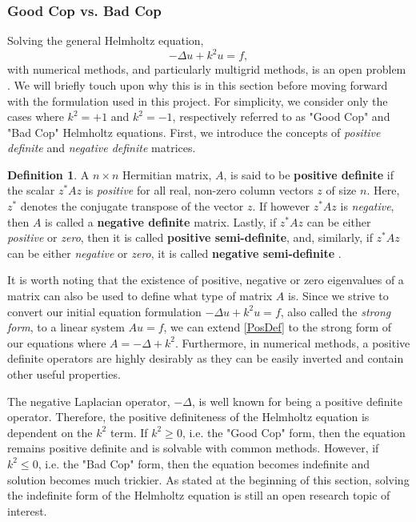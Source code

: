 \documentclass[]{article}
\theoremstyle{definition}
\newtheorem{definition}{Definition}[section]
\begin{document}
\subsubsection{Good Cop vs. Bad Cop}


Solving the general Helmholtz equation, 
\begin{equation}
-\Delta u + k^2 u = f,
\end{equation} 
with numerical methods, and particularly multigrid methods, is an open problem \cite{Ernst2012}.  We will briefly touch upon why this is in this section before moving forward with the formulation used in this project.  For simplicity, we consider only the cases where $k^2=+1$ and $k^2=-1$, respectively referred to as "Good Cop" and "Bad Cop" Helmholtz equations.  First, we introduce the concepts of \textit{positive definite} and \textit{negative definite} matrices.

\begin{definition}
A $n \times n$ Hermitian matrix, $A$, is said to be \textbf{positive definite} if the scalar $z^* A z$ is \textit{positive} for all real, non-zero column vectors $z$ of size $n$.  Here, $z^*$ denotes the conjugate transpose of the vector $z$.  If however $z^* A z$ is \textit{negative}, then $A$ is called a \textbf{negative definite} matrix.  Lastly, if $z^* A z$ can be either \textit{positive} or \textit{zero}, then it is called \textbf{positive semi-definite}, and, similarly, if $z^* A z$ can be either \textit{negative} or \textit{zero}, it is called \textbf{negative semi-definite} \cite{Keener2000}.
\label{PosDef}
\end{definition}

It is worth noting that the existence of positive, negative or zero eigenvalues of a matrix can also be used to define what type of matrix $A$ is.  Since we strive to convert our initial equation formulation $-\Delta u + k^2 u = f$, also called the \textit{strong form}, to a linear system $Au=f$, we can extend \eqref{PosDef} to the strong form of our equations where $A=-\Delta + k^2$.  Furthermore, in numerical methods, a positive definite operators are highly desirably as they can be easily inverted and contain other useful properties.  

The negative Laplacian operator, $-\Delta$, is well known for being a positive definite operator.  Therefore, the positive definiteness of the Helmholtz equation is dependent on the $k^2$ term.  If $k^2 \geq 0$, i.e. the "Good Cop" form, then the equation remains positive definite and is solvable with common methods.  However, if $k^2 \leq 0$, i.e. the "Bad Cop" form, then the equation becomes indefinite and solution becomes much trickier.  As stated at the beginning of this section, solving the indefinite form of the Helmholtz equation is still an open research topic of interest.
\end{document}
